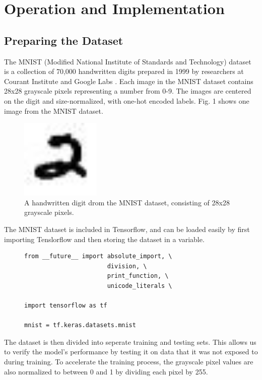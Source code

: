 \documentclass[transmag]{IEEEtran}
\begin{document}
\section{Operation and Implementation}

\subsection{Preparing the Dataset}

The MNIST (Modified National Institute of Standards and Technology) dataset
is a collection of 70,000 handwritten digits prepared in 1999 by researchers at
Courant Institute and Google Labs \cite{ref1}. Each image in the MNIST dataset
contains 28x28 grayscale pixels representing a number from 0-9. The images are
centered on the digit and size-normalized, with one-hot encoded labels. Fig. 1
shows one image from the MNIST dataset.

\begin{figure}[H]
  \centerline{\includegraphics[width=1.5in]{fig1}}
  \caption{A handwritten digit drom the MNIST dataset, consisting of 28x28
  grayscale pixels.\label{fig1}}
\end{figure}

The MNIST dataset is included in Tensorflow, and can be loaded easily by first
importing Tenslorflow and then storing the dataset in a variable.

\begin{figure}[H]
\begin{Verbatim}[samepage=true]
from __future__ import absolute_import, \
                       division, \
                       print_function, \
                       unicode_literals \

import tensorflow as tf

mnist = tf.keras.datasets.mnist
\end{Verbatim}
\end{figure}

The dataset is then divided into seperate training and testing sets.
This allows us to verify the model's performance by testing it on data that it
was not exposed to during training. To accelerate the training process, the 
grayscale pixel values are also normalized to between 0 and 1 by 
dividing each pixel by 255.
\end{document}
